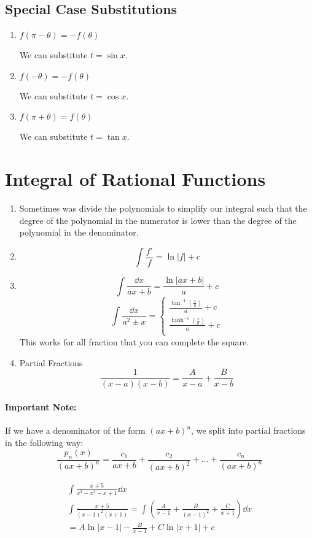 \documentclass[00_complete]{subfiles}
\begin{document}
\subsection{Special Case Substitutions}
\begin{enumerate}
    \item $f(\pi -\theta) = -f(\theta)$

        We can substitute $t=\sin x$.
    \item $f(-\theta) = -f(\theta)$

        We can substitute $t=\cos x$.
    \item $f(\pi+ \theta) = f(\theta)$

        We can substitute $t=\tan x$.
\end{enumerate}
\section{Integral of Rational Functions}
\begin{enumerate}
    \item Sometimes was divide the polynomials to simplify our integral such
        that the degree of the polynomial in the numerator is lower than the
        degree of the polynomial in the denominator.
    \item
        $$\int \frac{f'}{f} = \ln |f|+c$$
    \item
        $$\int \frac{\dd{x}}{ax+b} = \frac{\ln |ax+b|}{a} + c$$
        $$\int \frac{\dd{x}}{a^2\pm x} = \begin{cases}
            \frac{\tan^{-1}\left(\frac{x}{a}\right)}{a} +c\\
            \frac{\tanh^{-1}\left(\frac{x}{a}\right)}{a} +c\\
        \end{cases}$$
        This works for all fraction that you can complete the square.
    \item Partial Fractions
        $$\frac{1}{(x-a)(x-b)}=\frac{A}{x-a}+\frac{B}{x-b}$$
\end{enumerate}
\paragraph{Important Note:}
If we have a denominator of the form $(ax+b)^n$, we split into partial
fractions in the following way:
$$\frac{p_n(x)}{(ax+b)^n}=\frac{c_1}{ax+b}+\frac{c_2}{(ax+b)^2}+\dots+\frac{c_n}{(ax+b)^n}$$
\begin{example}
    $$
    \begin{gathered}
        \int \frac{x+5}{x^3-x^2-x+1}\dd{x} \\
        \int \frac{x+5}{(x-1)^2(x+1)}= \int
        \left(\frac{A}{x-1}+\frac{B}{(x-1)^2}+\frac{C}{x+1}\right)\dd{x} \\
        =A\ln|x-1|-\frac{B}{x-1}+C\ln|x+1| + c
    \end{gathered}
    $$
\end{example}
\end{document}
